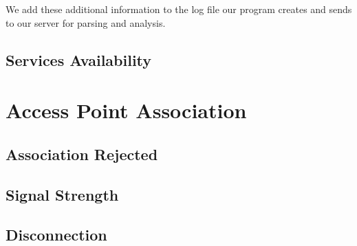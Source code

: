 We add these additional information to the log file our program creates and sends to our server for parsing and analysis.

\subsection{Services Availability}




\section{Access Point Association}

\subsection{Association Rejected}

\subsection{Signal Strength}

\subsection{Disconnection}


